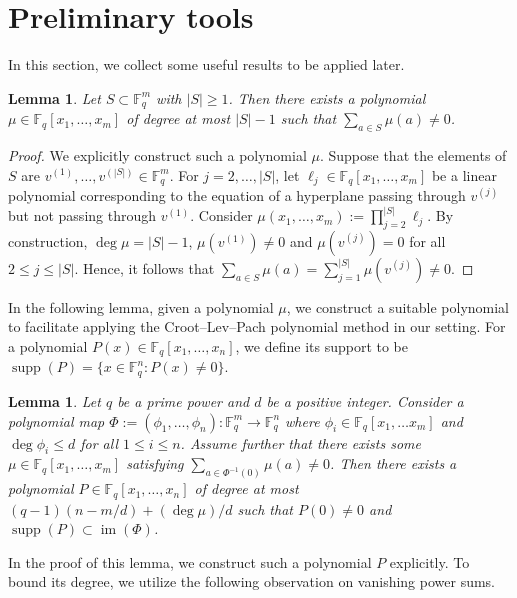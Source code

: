 \documentclass[11pt, reqno]{amsart}
\newtheorem{lemma}[theorem]{Lemma}
\theoremstyle{definition}
\newcommand{\F}{\mathbb{F}}
\DeclareMathOperator{\supp}{supp}
\DeclareMathOperator{\im}{im}
\newcommand{\abs}[1]{\left\lvert#1\right\rvert}
\begin{document}
\section{Preliminary tools}

In this section, we collect some useful results to be applied later. 

\begin{lemma}\label{lem:weight1}
Let $S \subset \F_q^m$ with $|S| \geq 1$. Then there exists a polynomial $\mu\in \F_q[x_1, \ldots, x_m]$ of degree at most $ \abs{S} -1$ such that $\sum_{a \in S} \mu(a) \neq 0$.
\end{lemma}

\begin{proof}
We explicitly construct such a polynomial $\mu$. Suppose that the elements of $S$ are $v^{(1)}, \ldots, v^{(\abs{S})} \in \F_q^m$. For $j = 2, \ldots, |S|$, let $\ell_j \in \F_q[x_1, \ldots, x_m]$ be a linear polynomial corresponding to the equation of a hyperplane passing through $v^{(j)}$ but not passing through $v^{(1)}$. Consider $\mu(x_1, \ldots, x_m) := \prod_{j=2}^{\abs{S}} \ell_j$. By construction, $\deg \mu = \abs{S} - 1$, $\mu(v^{(1)}) \neq 0$ and $\mu( v^{(j)}) = 0$ for all $2 \leq j \leq \abs{S}$. Hence, it follows that $\sum_{a \in S}\mu(a) = \sum_{j=1}^{|S|} \mu(v^{(j)}) \neq 0$.
\end{proof}

In the following lemma, given a polynomial $\mu$, we construct a suitable polynomial to facilitate applying the Croot--Lev--Pach polynomial method \cite{CLP17} in our setting. For a polynomial $P(x) \in \F_q[x_1, \ldots, x_n]$, we define its support to be $\supp(P) = \{ x \in \F_q^n: P(x) \neq 0 \}$. 

\begin{lemma}\label{lem:Poly}
Let $q$ be a prime power and $d$ be a positive integer. Consider a polynomial map $\Phi:= (\phi_1, \ldots, \phi_n): \F_q^m \to \F_q^n$ where $\phi_i \in \F_q[x_1, \ldots x_m]$ and $\deg \phi_i \leq d$ for all $1 \leq i \leq n$. Assume further that there exists some $\mu \in \F_q[x_1, \ldots, x_m]$ satisfying $\sum_{a \in \Phi^{-1}(0)} \mu(a) \neq 0$. Then there exists a polynomial $P \in \F_q[x_1, \ldots, x_n]$ of degree at most $(q-1)(n - m/d) + (\deg \mu)/d$ such that $P(0) \neq 0$ and $\supp(P) \subset \im(\Phi)$.
\end{lemma}

In the proof of this lemma, we construct such a polynomial $P$ explicitly. To bound its degree, we utilize the following observation on vanishing power sums. 
\end{document}
